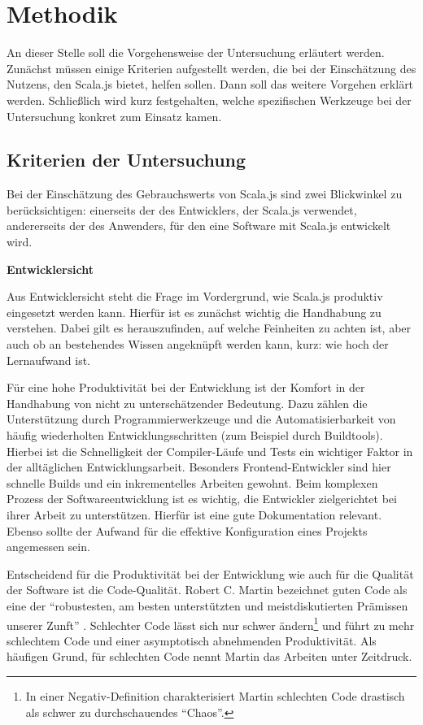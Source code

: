 \documentclass[a4paper, 12pt, hidelinks, listof=totoc, listoftables=totoc, bibliography=totoc]{scrreprt}
\newcommand{\MyMiniSec}[1]{\rmfamily\fontsize{12}{15}\selectfont
	\vspace{7pt}\textbf{#1} %
}
\begin{document}
\chapter{Methodik}\label{chap:methods}

An dieser Stelle soll die Vorgehensweise der Untersuchung erläutert werden. Zunächst müssen einige Kriterien aufgestellt werden, die bei der Einschätzung des Nutzens, den Scala.js bietet, helfen sollen. Dann soll das weitere Vorgehen erklärt werden. Schließlich wird kurz festgehalten, welche spezifischen Werkzeuge bei der Untersuchung konkret zum Einsatz kamen.

\section{Kriterien der Untersuchung}

Bei der Einschätzung des Gebrauchswerts von Scala.js sind zwei Blickwinkel zu berücksichtigen: einerseits der des Entwicklers, der Scala.js verwendet, andererseits der des Anwenders, für den eine Software mit Scala.js entwickelt wird.

\MyMiniSec{Entwicklersicht}

Aus Entwicklersicht steht die Frage im Vordergrund, wie Scala.js produktiv eingesetzt werden kann. Hierfür ist es zunächst wichtig die Handhabung zu verstehen. Dabei gilt es herauszufinden, auf welche Feinheiten zu achten ist, aber auch ob an bestehendes Wissen angeknüpft werden kann, kurz: wie hoch der Lernaufwand ist.

Für eine hohe Produktivität bei der Entwicklung ist der Komfort in der Handhabung von nicht zu unterschätzender Bedeutung. Dazu zählen die Unterstützung durch Programmierwerkzeuge und die Automatisierbarkeit von häufig wiederholten Entwicklungsschritten (zum Beispiel durch Buildtools). Hierbei ist die Schnelligkeit der Compiler-Läufe und Tests ein wichtiger Faktor in der alltäglichen Entwicklungsarbeit. Besonders Frontend-Entwickler sind hier schnelle Builds und ein inkrementelles Arbeiten gewohnt. Beim komplexen Prozess der Softwareentwicklung ist es wichtig, die Entwickler zielgerichtet bei ihrer Arbeit zu unterstützen. Hierfür ist eine gute Dokumentation relevant. Ebenso sollte der Aufwand für die effektive Konfiguration eines Projekts angemessen sein.

Entscheidend für die Produktivität bei der Entwicklung wie auch für die Qualität der Software ist die Code-Qualität. Robert C. Martin bezeichnet guten Code als eine der "`robustesten, am besten unterstützten und meistdiskutierten Prämissen unserer Zunft"' \cite[S. 27]{martin2009.CCH}. Schlechter Code lässt sich nur schwer ändern\footnote{In einer Negativ-Definition charakterisiert Martin schlechten Code drastisch als schwer zu durchschauendes "`Chaos"'.} und führt zu mehr schlechtem Code und einer asymptotisch abnehmenden Produktivität. Als häufigen Grund, für schlechten Code nennt Martin das Arbeiten unter Zeitdruck. \cite[S. 27 f.]{martin2009.CCH}
\end{document}
